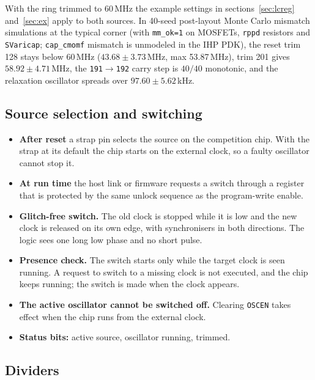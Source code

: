 \documentclass[10pt,a4paper]{article}
\newcommand{\reg}[1]{\texttt{#1}}
\begin{document}
With the ring trimmed to 60\,MHz the example settings in sections~\ref{sec:lcreg} and~\ref{sec:ex} apply to both
sources. In 40-seed post-layout Monte Carlo mismatch simulations at the typical corner (with \texttt{mm\_ok=1} on
MOSFETs, \texttt{rppd} resistors and \texttt{SVaricap}; \texttt{cap\_cmomf} mismatch is unmodeled in the IHP PDK),
the reset trim 128 stays below 60\,MHz ($43.68 \pm 3.73$\,MHz, max 53.87\,MHz), trim 201 gives $58.92 \pm 4.71$\,MHz,
the \texttt{191}$\to$\texttt{192} carry step is $40/40$ monotonic, and the relaxation oscillator spreads over
$97.60 \pm 5.62$\,kHz.

\subsection{Source selection and switching}

\begin{itemize}
\item \textbf{After reset} a strap pin selects the source on the competition chip. With the strap at its default
the chip starts on the external clock, so a faulty oscillator cannot stop it.
\item \textbf{At run time} the host link or firmware requests a switch through a register that is protected by
the same unlock sequence as the program-write enable.
\item \textbf{Glitch-free switch.} The old clock is stopped while it is low and the new clock is released on its
own edge, with synchronisers in both directions. The logic sees one long low phase and no short pulse.
\item \textbf{Presence check.} The switch starts only while the target clock is seen running. A request to switch to a missing clock is not executed, and the chip keeps running; the switch is made when the clock appears.
\item \textbf{The active oscillator cannot be switched off.} Clearing \reg{OSCEN} takes effect when the chip runs from the external clock.
\item \textbf{Status bits:} active source, oscillator running, trimmed.
\end{itemize}

\subsection{Dividers}
\end{document}
